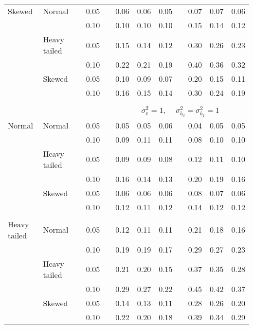 \begin{table}[ht]
\begin{scriptsize}
\begin{center}
\begin{tabular}{ll p{.1cm} c p{.1cm} rrr p{.1cm} rrr}
Skewed       & Normal       && 0.05 &&  0.06 & 0.06 & 0.05 && 0.07 & 0.07 & 0.06 \\ 
             &              && 0.10 &&  0.10 & 0.10 & 0.10 && 0.15 & 0.14 & 0.12 \\ 
             & Heavy tailed && 0.05 &&  0.15 & 0.14 & 0.12 && 0.30 & 0.26 & 0.23 \\ 
             &              && 0.10 &&  0.22 & 0.21 & 0.19 && 0.40 & 0.36 & 0.32 \\ 
             & Skewed       && 0.05 &&  0.10 & 0.09 & 0.07 && 0.20 & 0.15 & 0.11 \\ 
             &              && 0.10 &&  0.16 & 0.15 & 0.14 && 0.30 & 0.24 & 0.19 \\ 

&&&&&&&&&&&\\
& && && \multicolumn{7}{c}{$\sigma_{\varepsilon}^2 = 1$, \ \ $\sigma_{b_0}^2 = \sigma_{b_1}^2 = 1$} \\ \cline{6-12}
\rowcolor{gray!20}Normal       & Normal       && 0.05 &&  0.05 & 0.05 & 0.06 && 0.04 & 0.05 & 0.05 \\ 
\rowcolor{gray!20}             &              && 0.10 &&  0.09 & 0.11 & 0.11 && 0.08 & 0.10 & 0.10 \\ 
\rowcolor{gray!20}             & Heavy tailed && 0.05 &&  0.09 & 0.09 & 0.08 && 0.12 & 0.11 & 0.10 \\ 
\rowcolor{gray!20}             &              && 0.10 &&  0.16 & 0.14 & 0.13 && 0.20 & 0.19 & 0.16 \\ 
\rowcolor{gray!20}             & Skewed       && 0.05 &&  0.06 & 0.06 & 0.06 && 0.08 & 0.07 & 0.06 \\ 
\rowcolor{gray!20}             &              && 0.10 &&  0.12 & 0.11 & 0.12 && 0.14 & 0.12 & 0.12 \\ 
             &&&&&&&&&&&\\
Heavy tailed & Normal       && 0.05 &&  0.12 & 0.11 & 0.11 && 0.21 & 0.18 & 0.16 \\ 
             &              && 0.10 &&  0.19 & 0.19 & 0.17 && 0.29 & 0.27 & 0.23 \\ 
             & Heavy tailed && 0.05 &&  0.21 & 0.20 & 0.15 && 0.37 & 0.35 & 0.28 \\ 
             &              && 0.10 &&  0.29 & 0.27 & 0.22 && 0.45 & 0.42 & 0.37 \\ 
             & Skewed       && 0.05 &&  0.14 & 0.13 & 0.11 && 0.28 & 0.26 & 0.20 \\ 
             &              && 0.10 &&  0.22 & 0.20 & 0.18 && 0.39 & 0.34 & 0.29 \\ 

\end{tabular}
\end{center}
\end{scriptsize}
\end{table}
